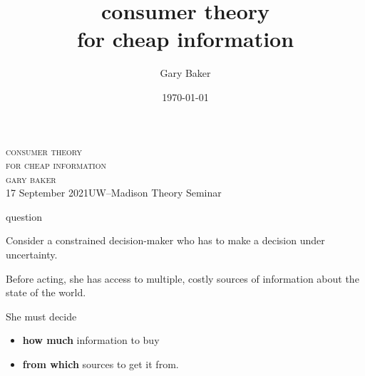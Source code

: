 \documentclass[square,]{gBakerBeamer}
\title{consumer theory\\ for cheap information}
\author{Gary Baker}
\date{\today}
\renewcommand{\|}{\,|\,}
\begin{document}
\begin{frame}
  \vspace{4em}
  {\LARGE \textsc{consumer theory\\[0.2em] for cheap information}}\\[0.7em]
  {\Large \textsc{\alert{gary baker}}}\\[3em]

  {\alert{\small 17 September 2021\hfill UW--Madison Theory Seminar}}
  \note{%

  }
\end{frame}


\begin{frame}{question}

  Consider a constrained decision-maker who has to make a decision under uncertainty.\vspace{\baselineskip}

  Before acting, she has access to multiple, costly sources of information about the state of the world.\pause\vspace{\baselineskip}

  She must decide
  \begin{itemize}
    \item \textbf{how much} information to buy
    \item<3> \alert{\large\textbf{from which} sources to get it from.}
  \end{itemize}

  \note{%

  }
\end{frame}
\end{document}
